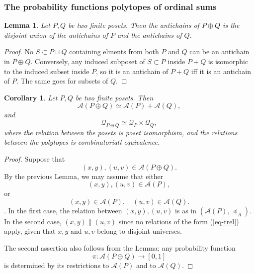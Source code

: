 \documentclass[11pt,a4paper,abstract=yes]{scrartcl}
\theoremstyle{plain}
\newtheorem{lemma}[theorem]{Lemma}
\newtheorem{corollary}[theorem]{Corollary}
\newcommand{\prpolytope}[1]{\mathcal{Q}_{#1}}
\newcommand{\twoanti}[1]{\mathcal{A}({#1})}
\newcommand{\transterel}{\preceq_{A}}
\begin{document}
\subsubsection{The probability functions polytopes of ordinal sums}
\label{sec:org353cf2d}
\begin{lemma}
Let \(P,Q\) be two finite posets. Then the antichains of \(P \oplus Q\) is the disjoint union of the antichains of \(P\) and
the antichains of \(Q\).
\label{lemma-ordinalsum-antichains}
\end{lemma}
\begin{proof}
No \(S \subset P \sqcup Q\) containing elments from both \(P\) and \(Q\) can be an antichain in \(P \oplus Q\).
Conversely, any induced subposet of \(S \subset P\) inside \(P+Q\) is isomorphic to the induced subset inside
\(P\), so it is an antichain of \(P+Q\) iff it is an antichain of \(P\). The same goes for subsets of \(Q\).
\end{proof}
\begin{corollary}
Let \(P,Q\) be two finite posets. Then
\[\twoanti{P \oplus Q} \simeq \twoanti{P} + \twoanti{Q},\]
and
\[\prpolytope{P \oplus Q} \simeq \prpolytope{P} \times \prpolytope{Q},\]
where the relation between the posets is poset isomorphism, and the relations between
the polytopes is combinatoriall equivalence.
\label{corr-ordinalsum-twoanti}
\end{corollary}
\begin{proof}
Suppose that
\[(x,y), (u,v) \in \twoanti{P \oplus Q}.\] By the previous Lemma, we may assume that
either
\[(x,y), (u,v) \in \twoanti{P},\] or
\[(x,y)\in \twoanti{P},\quad (u,v)\in \twoanti{Q}.\].
In the first case, the relation between \((x,y), (u,v)\) is as in \((\twoanti{P}, \transterel)\).
In the second case, \((x,y) \parallel (u,v)\) since no relations of the form (\ref{eq-trel}) apply, given that
\(x,y\) and \(u,v\) belong to disjoint universes.

The second assertion also follows from the Lemma; any probability function
\[\pi: \twoanti{P \oplus Q} \to [0,1]\]
is determined by its restrictions to \(\twoanti{P}\) and to \(\twoanti{Q}\).
\end{proof}
\end{document}
